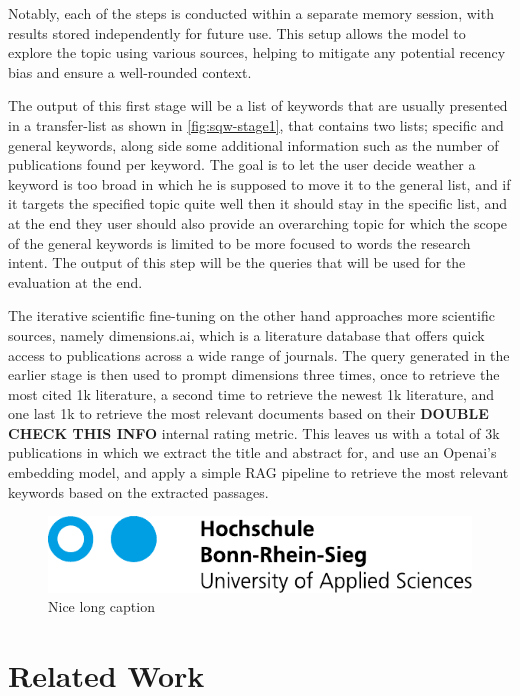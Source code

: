 Notably, each of the steps is conducted within a separate memory session, with results stored independently for future use. This setup allows the model to explore the topic using various sources, helping to mitigate any potential recency bias and ensure a well-rounded context.

The output of this first stage will be a list of keywords that are usually presented in a transfer-list as shown in \autoref{fig:sqw-stage1}, that contains two lists; specific and general keywords, along side some additional information such as the number of publications found per keyword. The goal is to let the user decide weather a keyword is too broad in which he is supposed to move it to the general list, and if it targets the specified topic quite well then it should stay in the specific list, and at the end they user should also provide an overarching topic for which the scope of the general keywords is limited to be more focused to words the research intent. The output of this step will be the queries that will be used for the evaluation at the end.

The iterative scientific fine-tuning on the other hand approaches more scientific sources, namely dimensions.ai, which is a literature database that offers quick access to publications across a wide range of journals. The query generated in the earlier stage is then used to prompt dimensions three times, once to retrieve the most cited 1k literature, a second time to retrieve the newest 1k literature, and one last 1k to retrieve the most relevant documents based on their \textbf{DOUBLE CHECK THIS INFO} internal rating metric. This leaves us with a total of 3k publications in which we extract the title and abstract for, and use an Openai's embedding model, and apply a simple RAG pipeline to retrieve the most relevant keywords based on the extracted passages.


\begin{figure}
	\centering
	\includegraphics{FrontBackmatter/H-BRS_Logo_A4}
	\caption[Nice short caption]{Nice long caption}
	\label{fig:sqw-stage1}
\end{figure}

\section{Related Work}\label{sec:relwork}

